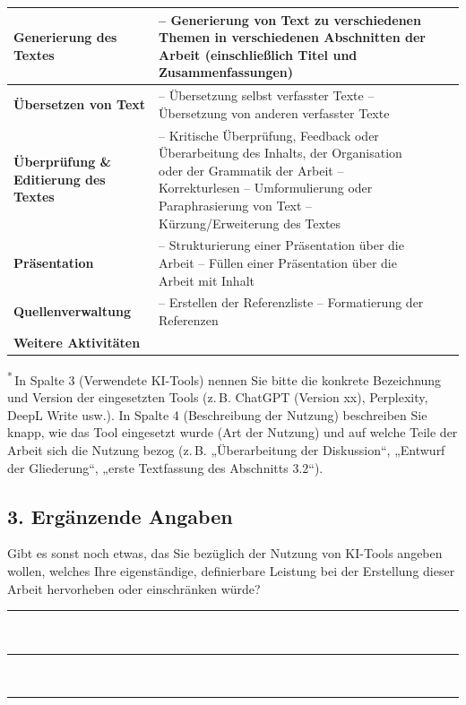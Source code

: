 \begin{tabularx}{\textwidth}{|L|L|L|L|}
\textbf{Generierung des Textes} &
– Generierung von Text zu verschiedenen Themen in verschiedenen Abschnitten der Arbeit (einschließlich Titel und Zusammenfassungen) &
&
\\
\hline
\textbf{Übersetzen von Text} &
– Übersetzung selbst verfasster Texte \newline
– Übersetzung von anderen verfasster Texte &
&
\\
\hline
\textbf{Überprüfung \& Editierung des Textes} &
– Kritische Überprüfung, Feedback oder Überarbeitung des Inhalts, der Organisation oder der Grammatik der Arbeit \newline
– Korrekturlesen \newline
– Umformulierung oder Paraphrasierung von Text \newline
– Kürzung/Erweiterung des Textes &
&
\\
\hline
\textbf{Präsentation} &
– Strukturierung einer Präsentation über die Arbeit \newline
– Füllen einer Präsentation über die Arbeit mit Inhalt &
&
\\
\hline
\textbf{Quellenverwaltung} &
– Erstellen der Referenzliste \newline
– Formatierung der Referenzen &
&
\\
\hline
\textbf{Weitere Aktivitäten} & & & \\
\end{tabularx}
\endgroup
\vspace{2em}
\noindent\scriptsize
\textsuperscript{*}\,In Spalte 3 (Verwendete KI-Tools) nennen Sie bitte die konkrete Bezeichnung und Version der eingesetzten Tools (z.\,B. ChatGPT (Version xx), Perplexity, DeepL Write usw.). In Spalte 4 (Beschreibung der Nutzung) beschreiben Sie knapp, wie das Tool eingesetzt wurde (Art der Nutzung) und auf welche Teile der Arbeit sich die Nutzung bezog (z.\,B. „Überarbeitung der Diskussion“, „Entwurf der Gliederung“, „erste Textfassung des Abschnitts 3.2“).
\vspace{2em}

\subsection*{3. Ergänzende Angaben}

Gibt es sonst noch etwas, das Sie bezüglich der Nutzung von KI-Tools angeben wollen, welches Ihre eigenständige, definierbare Leistung bei der Erstellung dieser Arbeit hervorheben oder einschränken würde?

\vspace{1\baselineskip}
\noindent\rule{\textwidth}{0.4pt}\\[0.8\baselineskip]
\noindent\rule{\textwidth}{0.4pt}\\[0.8\baselineskip]
\noindent\rule{\textwidth}{0.4pt}

